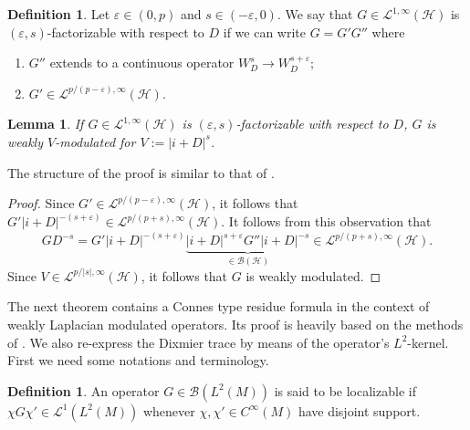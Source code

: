 \documentclass[10pt]{amsart}
\newtheorem{lem}[thm]{Lemma}
\theoremstyle{remark}
\theoremstyle{definition}
\newtheorem{deef}[thm]{Definition}
\begin{document}
\begin{deef}
Let ${\varepsilon}\in (0,p)$ and $s\in (-{\varepsilon},0)$. We say that $G\in \mathcal{L}^{1,\infty}({\mathcal{H}})$ is $({\varepsilon},s)$-factorizable with respect to $D$ if we can write $G=G'G''$ where
\begin{enumerate}
\item $G''$ extends to a continuous operator $W^{s}_D\to W^{s+{\varepsilon}}_D$;
\item $G' \in \mathcal{L}^{p/(p-{\varepsilon}),\infty}({\mathcal{H}})$.
\end{enumerate}
\end{deef}

\begin{lem}
\label{lszformnew}
If $G\in \mathcal{L}^{1,\infty}({\mathcal{H}})$ is $({\varepsilon},s)$-factorizable with respect to $D$, $G$ is weakly $V$-modulated for $V:=|i+D|^{s}$.
\end{lem}

The structure of the proof is similar to that of \cite[Lemma 5.11]{gimpgoff}.

\begin{proof}
Since $G' \in \mathcal{L}^{p/(p-{\varepsilon}),\infty}({\mathcal{H}})$, it follows that $G'|i+D|^{-(s+{\varepsilon})} \in \mathcal{L}^{p/(p+s),\infty}({\mathcal{H}})$. It follows from this observation that
$$GD^{-s}=G'|i+D|^{-(s+{\varepsilon})}\underbrace{|i+D|^{s+{\varepsilon}}G''|i+D|^{-s}}_{\in {\mathcal{B}}({\mathcal{H}})}\in \mathcal{L}^{p/(p+s),\infty}({\mathcal{H}}).$$
Since $V\in \mathcal{L}^{p/|s|,\infty}({\mathcal{H}})$, it follows that $G$ is weakly modulated.
\end{proof}

The next theorem contains a Connes type residue formula in the context of weakly Laplacian modulated operators. Its proof is heavily based on the methods of \cite[Chapter 11.6]{sukolord}. We also re-express the Dixmier trace by means of the operator's $L^2$-kernel. First we need some notations and terminology. 

\begin{deef}
\label{localdifd}
An operator $G\in {\mathcal{B}}(L^2(M))$ is said to be localizable if $\chi G\chi'\in \mathcal{L}^1(L^2(M))$ whenever $\chi,\chi'\in C^\infty(M)$ have disjoint support. 
\end{deef}
\end{document}
